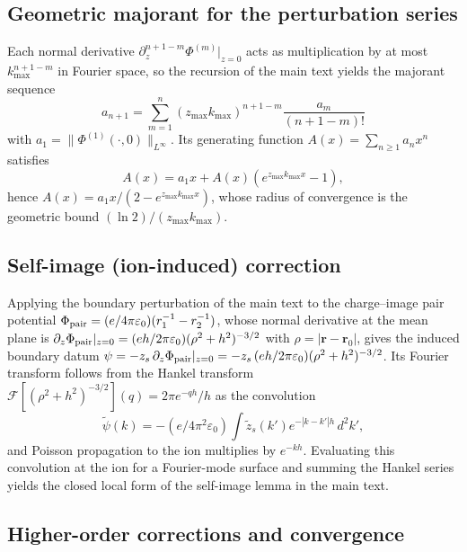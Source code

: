 \documentclass[12pt,a4paper]{article}
\begin{document}
\subsection{Geometric majorant for the perturbation series}

Each normal derivative $\partial_z^{n+1-m}\Phi^{(m)}|_{z=0}$ acts as
multiplication by at most $k_{\max}^{n+1-m}$ in Fourier space, so the
recursion of the main text yields the majorant sequence
\begin{equation*}
a_{n+1}=\sum_{m=1}^{n}(z_{\max}k_{\max})^{n+1-m}\frac{a_m}{(n+1-m)!}
\end{equation*}
with $a_1=\|\Phi^{(1)}(\cdot,0)\|_{L^\infty}$.  Its generating function
$A(x)=\sum_{n\ge1}a_nx^n$ satisfies
\begin{equation*}
A(x)=a_1x+A(x)(e^{z_{\max}k_{\max}x}-1),
\end{equation*}
hence $A(x)=a_1x/(2-e^{z_{\max}k_{\max}x})$, whose radius of convergence
is the geometric bound $(\ln 2)/(z_{\max}k_{\max})$.

\subsection{Self-image (ion-induced) correction}

Applying the boundary perturbation of the main text to the charge--image
pair potential $\Phi_{\rm pair}=(e/4\pi\varepsilon_0)(r_1^{-1}-r_2^{-1})$,
whose normal derivative at the mean plane is
$\partial_z\Phi_{\rm pair}|_{z=0}=(e h/2\pi\varepsilon_0)(\rho^2+h^2)^{-3/2}$
with $\rho=|\mathbf{r}-\mathbf{r}_0|$, gives the induced boundary datum
$\psi=-z_s\,\partial_z\Phi_{\rm pair}|_{z=0}
= -z_s\,(e h/2\pi\varepsilon_0)(\rho^2+h^2)^{-3/2}$.  Its Fourier transform
follows from the Hankel transform
$\mathcal{F}[(\rho^2+h^2)^{-3/2}](q)=2\pi e^{-qh}/h$ as the convolution
\begin{equation*}
\tilde{\psi}(k)=-(e/4\pi^2\varepsilon_0)\int\tilde{z}_s(k')e^{-|k-k'|h}\,d^2k',
\end{equation*}
and Poisson propagation to the ion multiplies by $e^{-kh}$.  Evaluating
this convolution at the ion for a Fourier-mode surface and summing the
Hankel series yields the closed local form of the self-image lemma in the
main text.

\subsection{Higher-order corrections and convergence}
\end{document}
